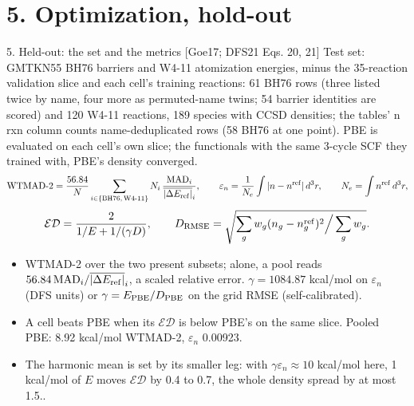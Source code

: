 \section{5. Optimization, hold-out}

\begin{frame}{5. Held-out: the set and the metrics [Goe17; DFS21 Eqs. 20, 21]}
  \small
  Test set: GMTKN55 BH76 barriers and W4-11 atomization energies, minus the 35-reaction validation slice and each cell's training reactions: 61 BH76 rows (three listed twice by name, four more as permuted-name twins; 54 barrier identities are scored) and 120 W4-11 reactions, 189 species with CCSD densities; the tables' n rxn column counts name-deduplicated rows (58 BH76 at one point). PBE is evaluated on each cell's own slice; the functionals with the same 3-cycle SCF they trained with, PBE's density converged.
  \[
  \mathrm{WTMAD\text{-}2} = \frac{56.84}{N}\sum_{i\in\{\rm BH76,\,W4\text{-}11\}} N_i\,\frac{\mathrm{MAD}_i}{\overline{|\Delta E_{\rm ref}|}_i}, \qquad
  \varepsilon_n = \frac{1}{N_e}\int |n - n^{\rm ref}|\, d^3r, \qquad N_e = \int n^{\rm ref}\, d^3r,
  \]
  \[
  \mathcal{ED} = \frac{2}{1/E + 1/(\gamma D)}, \qquad
  D_{\rm RMSE} = \sqrt{\sum_g w_g (n_g - n_g^{\rm ref})^2 \Big/ \sum_g w_g}.
  \]
  \begin{itemize}
    \item WTMAD-2 over the two present subsets; alone, a pool reads $56.84\,\mathrm{MAD}_i / \overline{|\Delta E_{\rm ref}|}_i$, a scaled relative error. $\gamma = 1084.87$ kcal/mol on $\varepsilon_n$ (DFS units) or $\gamma = E_{\rm PBE}/D_{\rm PBE}$ on the grid RMSE (self-calibrated).
    \item A cell beats PBE when its $\mathcal{ED}$ is below PBE's on the same slice. Pooled PBE: 8.92 kcal/mol WTMAD-2, $\varepsilon_n$ 0.00923.
    \item The harmonic mean is set by its smaller leg: with $\gamma\varepsilon_n \approx 10$ kcal/mol here, 1 kcal/mol of $E$ moves $\mathcal{ED}$ by 0.4 to 0.7, the whole density spread by at most 1.5..
  \end{itemize}
\end{frame}
